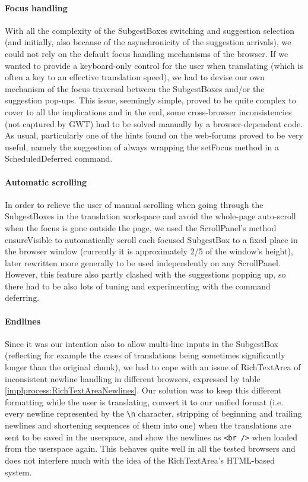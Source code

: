 \paragraph{Focus handling}
With all the complexity of the SubgestBoxes switching and suggestion selection (and initially, also because of the asynchronicity of the suggestion arrivals), we could not rely on the default focus handling mechanisms of the browser. If we wanted to provide a keyboard-only control for the user when translating (which is often a key to an effective translation speed), we had to devise our own mechanism of the focus traversal between the SubgestBoxes and/or the suggestion pop-ups. This issue, seemingly simple, proved to be quite complex to cover to all the implications and in the end, some cross-browser inconsistencies (not captured by GWT) had to be solved manually by a browser-dependent code. As usual, particularly one of the hints found on the web-forums proved to be very useful, namely the suggestion of always wrapping the setFocus method in a ScheduledDeferred command.

\paragraph{Automatic scrolling}
In order to relieve the user of manual scrolling when going through the SubgestBoxes in the translation workspace and avoid the whole-page auto-scroll when the focus is gone outside the page, we used the ScrollPanel's method ensureVisible to automatically scroll each focused SubgestBox to a fixed place in the browser window (currently it is approximately 2/5 of the window's height), later rewritten more generally to be used independently on any ScrollPanel. However, this feature also partly clashed with the suggestions popping up, so there had to be also lots of tuning and experimenting with the command deferring.

\paragraph{Endlines}
Since it was our intention also to allow multi-line inputs in the SubgestBox (reflecting for example the cases of translations being sometimes significantly longer than the original chunk), we had to cope with an issue of RichTextArea of inconsistent newline handling in different browsers, expressed by table \ref{implprocess:RichTextAreaNewlines}. Our solution was to keep this different formatting while the user is translating, convert it to our unified format (i.e. every newline represented by the \verb=\n= character, stripping of beginning and trailing newlines and shortening sequences of them into one) when the translations are sent to be saved in the userspace, and show the newlines as \verb=<br />= when loaded from the userspace again. This behaves quite well in all the tested browsers and does not interfere much with the idea of the RichTextArea's HTML-based system.


